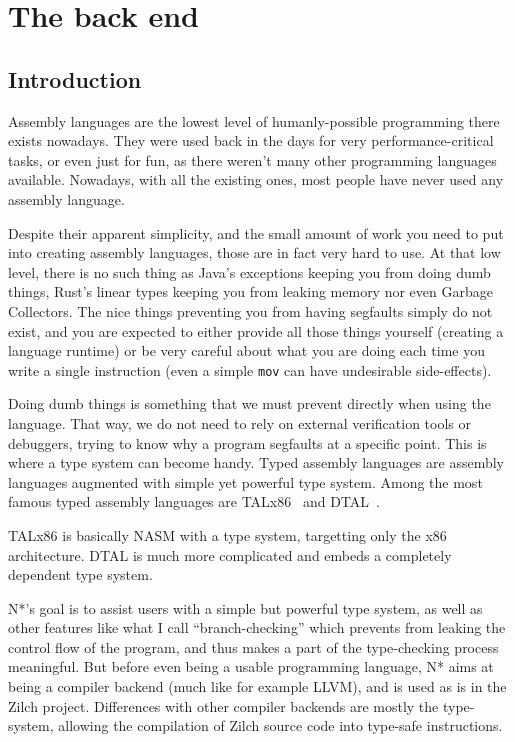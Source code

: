 \part{The back end}\label{part:nstar}


\chapter{Introduction}\label{chap:nstar-abstract}

Assembly languages are the lowest level of humanly-possible programming there exists nowadays. They were used back in the days for very performance-critical tasks, or even just for fun, as there weren't many other programming languages available. Nowadays, with all the existing ones, most people have never used any assembly language.

Despite their apparent simplicity, and the small amount of work you need to put into creating assembly languages, those are in fact very hard to use. At that low level, there is no such thing as Java's exceptions keeping you from doing dumb things, Rust's linear types keeping you from leaking memory nor even Garbage Collectors. The nice things preventing you from having segfaults simply do not exist, and you are expected to either provide all those things yourself (creating a language runtime) or be very careful about what you are doing each time you write a single instruction (even a simple \texttt{mov} can have undesirable side-effects).

Doing dumb things is something that we must prevent directly when using the language. That way, we do not need to rely on external verification tools or debuggers, trying to know why a program segfaults at a specific point.
This is where a type system can become handy. Typed assembly languages are assembly languages augmented with simple yet powerful type system. Among the most famous typed assembly languages are TALx86~\cite{TALx86} and DTAL~\cite{DTAL}.

TALx86 is basically NASM with a type system, targetting only the x86 architecture. DTAL is much more complicated and embeds a completely dependent type system.

\vspace{\baselineskip}

N*'s goal is to assist users with a simple but powerful type system, as well as other features like what I call ``branch-checking'' which prevents from leaking the control flow of the program, and thus makes a part of the type-checking process meaningful.
But before even being a usable programming language, N* aims at being a compiler backend (much like for example LLVM), and is used as is in the Zilch project. Differences with other compiler backends are mostly the type-system, allowing the compilation of Zilch source code into type-safe instructions.

